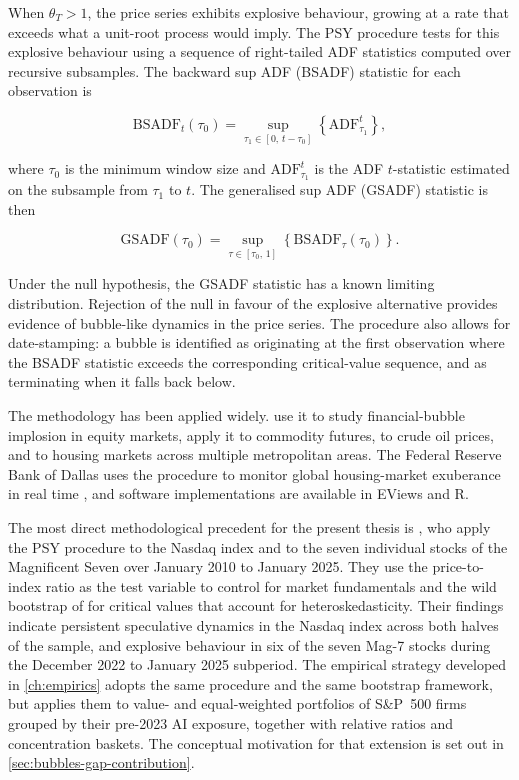 \noindent When $\theta_T > 1$, the price series exhibits explosive behaviour, growing at a rate that exceeds what a unit-root process would imply. The PSY procedure tests for this explosive behaviour using a sequence of right-tailed ADF statistics computed over recursive subsamples. The backward sup ADF (BSADF) statistic for each observation is

\begin{equation}
\text{BSADF}_t(\tau_0) = \sup_{\tau_1 \in [0,\, t - \tau_0]} \left\{ \text{ADF}_{\tau_1}^{t} \right\},
\label{eq:bsadf}
\end{equation}

\noindent where $\tau_0$ is the minimum window size and $\text{ADF}_{\tau_1}^{t}$ is the ADF $t$-statistic estimated on the subsample from $\tau_1$ to $t$. The generalised sup ADF (GSADF) statistic is then

\begin{equation}
\text{GSADF}(\tau_0) = \sup_{\tau \in [\tau_0,\, 1]} \left\{ \text{BSADF}_\tau(\tau_0) \right\}.
\label{eq:gsadf}
\end{equation}

Under the null hypothesis, the GSADF statistic has a known limiting distribution. Rejection of the null in favour of the explosive alternative provides evidence of bubble-like dynamics in the price series. The procedure also allows for date-stamping: a bubble is identified as originating at the first observation where the BSADF statistic exceeds the corresponding critical-value sequence, and as terminating when it falls back below.

The methodology has been applied widely. \citet{phillipsShi2018} use it to study financial-bubble implosion in equity markets, \citet{etienneIrwinGarcia2015} apply it to commodity futures, \citet{caspiKatzkeGupta2018} to crude oil prices, and \citet{pavlidisEtAl2016} to housing markets across multiple metropolitan areas. The Federal Reserve Bank of Dallas uses the procedure to monitor global housing-market exuberance in real time \citep{phillipsShi2020}, and software implementations are available in EViews and R.

The most direct methodological precedent for the present thesis is \citet{baselePhillipsShi2025}, who apply the PSY procedure to the Nasdaq index and to the seven individual stocks of the Magnificent Seven over January 2010 to January 2025. They use the price-to-index ratio as the test variable to control for market fundamentals and the wild bootstrap of \citet{harveyEtAl2016} for critical values that account for heteroskedasticity. Their findings indicate persistent speculative dynamics in the Nasdaq index across both halves of the sample, and explosive behaviour in six of the seven Mag-7 stocks during the December 2022 to January 2025 subperiod. The empirical strategy developed in \cref{ch:empirics} adopts the same procedure and the same bootstrap framework, but applies them to value- and equal-weighted portfolios of S\&P~500 firms grouped by their pre-2023 AI exposure, together with relative ratios and concentration baskets. The conceptual motivation for that extension is set out in \cref{sec:bubbles-gap-contribution}.


